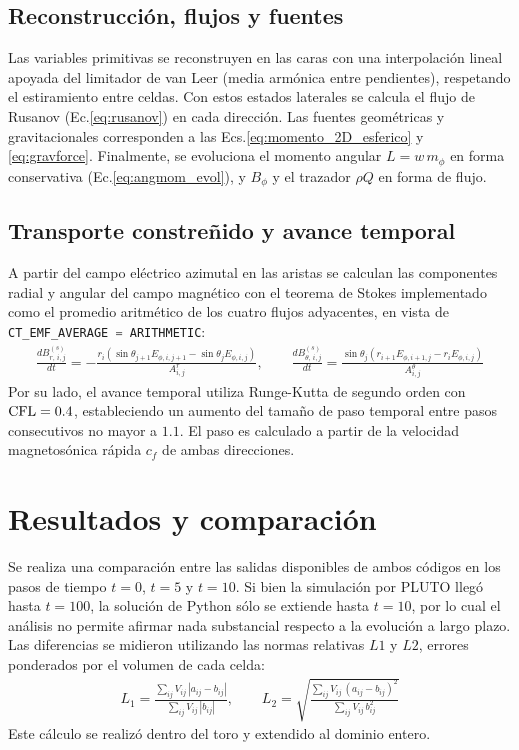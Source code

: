\documentclass[11pt, letterpaper]{article}
\begin{document}
\subsection{Reconstrucción, flujos y fuentes}

Las variables primitivas se reconstruyen en las caras con una interpolación lineal apoyada del limitador de van Leer (media armónica entre pendientes), respetando el estiramiento entre celdas. Con estos estados laterales se calcula el flujo de Rusanov (Ec.\ref{eq:rusanov}) en cada dirección. Las fuentes geométricas y gravitacionales corresponden a las Ecs.\ref{eq:momento_2D_esferico} y \ref{eq:gravforce}. Finalmente, se evoluciona el momento angular $L = w\,m_{\phi}$ en forma conservativa (Ec.\ref{eq:angmom_evol}), y $B_{\phi}$ y el trazador $\rho Q$ en forma de flujo.

\subsection{Transporte constreñido y avance temporal}

A partir del campo eléctrico azimutal en las aristas se calculan las componentes radial y angular del campo magnético con el teorema de Stokes implementado como el promedio aritmético de los cuatro flujos adyacentes, en vista de \lstinline[language=C]|CT_EMF_AVERAGE = ARITHMETIC|:
\begin{align}\label{eq:CT_update}
    \frac{dB^{(s)}_{r,\,i,j}}{dt} = -\frac{r_i\left(\sin\theta_{j+1}E_{\phi,i,j+1} - \sin\theta_{j}E_{\phi,i,j}\right)}{A^r_{i,j}}, \qquad
    \frac{dB^{(s)}_{\theta,\,i,j}}{dt} = \frac{\sin\theta_j\left(r_{i+1}E_{\phi,i+1,j} - r_{i}E_{\phi,i,j}\right)}{A^\theta_{i,j}}
\end{align}
Por su lado, el avance temporal utiliza Runge-Kutta de segundo orden con $\rm{CFL}=0.4$, estableciendo un aumento del tamaño de paso temporal entre pasos consecutivos no mayor a $1.1$. El paso es calculado a partir de la velocidad magnetosónica rápida $c_f$ de ambas direcciones.

\section{Resultados y comparación}

Se realiza una comparación entre las salidas disponibles de ambos códigos en los pasos de tiempo $t=0$, $t=5$ y $t=10$. Si bien la simulación por PLUTO llegó hasta $t=100$, la solución de Python sólo se extiende hasta $t=10$, por lo cual el análisis no permite afirmar nada substancial respecto a la evolución a largo plazo. Las diferencias se midieron utilizando las normas relativas $L1$ y $L2$, errores ponderados por el volumen de cada celda:
\begin{align}\label{eq:normas}
    L_1 = \frac{\sum_{ij} V_{ij}\,|a_{ij} - b_{ij}|}{\sum_{ij} V_{ij}\,|b_{ij}|}, \qquad
    L_2 = \sqrt{\frac{\sum_{ij} V_{ij}\,(a_{ij} - b_{ij})^2}{\sum_{ij} V_{ij}\,b_{ij}^2}}
\end{align}
Este cálculo se realizó dentro del toro y extendido al dominio entero.
\end{document}
